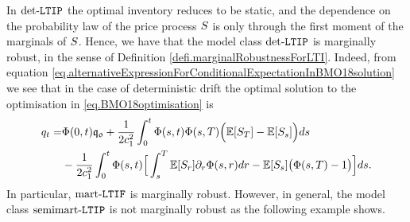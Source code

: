 \documentclass[10pt,a4paper]{article}
\begin{document}
In $\text{det-}\mathtt{LTIP}$ the optimal inventory reduces to be static, and the dependence on the probability law of the price process $S$ is only through the first moment of the marginals of $S$.  Hence, we have that the model class $\text{det-}\mathtt{LTIP}$ is marginally robust, in the sense of Definition \ref{defi.marginalRobustnessForLTI}. Indeed, from equation \eqref{eq.alternativeExpressionForConditionalExpectationInBMO18solution} we see that in the case of deterministic drift the optimal solution to the optimisation in \eqref{eq.BMO18optimisation} is 
\begin{equation*}
\begin{split}
q_t 
= &
\Phi(0,t)\mathfrak{q_0} 
+\frac{1}{2c_{1}^{2}}
 \int_{0}^{t}  \Phi(s,t)\Phi(s,T)\Big(\mathbb{{E}}[S_T]- \mathbb{{E}} [S_s]\Big) ds \\
&- \frac{1}{2c_{1}^{2}}
 \int_{0}^{t}\Phi(s,t)\Big[
 		\int_{s}^{T} \mathbb{{E}}[S_r]\partial_r \Phi (s,r)dr - \mathbb{{E}}[S_s] \big(\Phi(s,T)-1\big)
		\Big]ds.
\end{split}
\end{equation*}
In particular,  $\text{mart-}\mathtt{LTIF}$ is marginally robust. However, in general, the model class $\text{semimart-}\mathtt{LTIP}$ is not marginally robust as the following example shows. 
\end{document}
